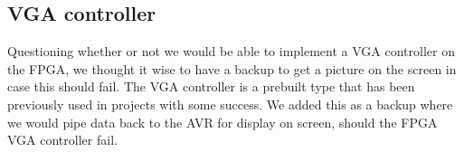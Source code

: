\subsection{VGA controller}

Questioning whether or not we would be able to implement a VGA controller on the FPGA, we thought it wise to have a backup to get a picture on the screen in case this should fail. The VGA controller is a prebuilt type that has been previously used in projects with some success. We added this as a backup where we would pipe data back to the AVR for display on screen, should the FPGA VGA controller fail.


